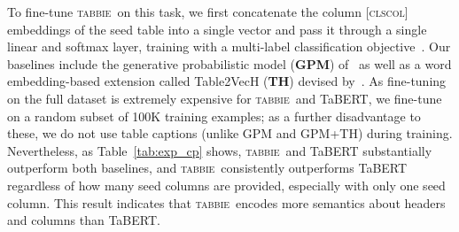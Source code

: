 \documentclass[11pt]{article}
\newcommand{\name}[0]{\textsc{tabbie}}
\begin{document}
To fine-tune \name\ on this task, we first concatenate the column \textsc{[clscol]} embeddings of the seed table into a single vector and pass it through a single linear and softmax layer, training with a multi-label classification objective~\cite{Mahajan2018ExploringTL}. Our baselines include the generative probabilistic model (\textbf{GPM}) of~\citet{entitables} as well as a word embedding-based extension called Table2VecH (\textbf{TH}) devised by~\citet{Zhang:2018:AHT}. As fine-tuning on the full dataset is extremely expensive for \name\ and TaBERT, we fine-tune on a random subset of 100K training examples; as a further disadvantage to these, we do not use table captions (unlike GPM and GPM+TH) during training. Nevertheless, as Table~\ref{tab:exp_cp} shows, \name\ and TaBERT substantially outperform both baselines, and \name\ consistently outperforms TaBERT regardless of how many seed columns are provided, especially with only one seed column. This result indicates that \name\ encodes more semantics about headers and columns than TaBERT. 
\end{document}

